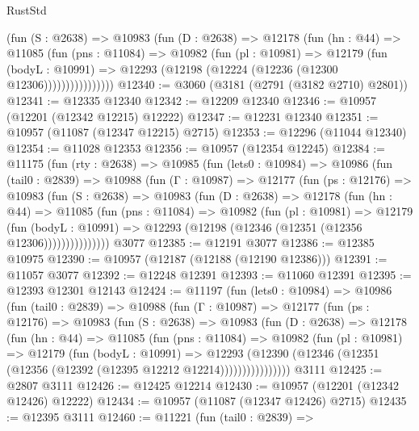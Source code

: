 \begin{lexlean}{RustStd}
\begin{coremodule}
                (fun (S : @2638) =>
                @10983
                  (fun (D : @2638) =>
                  @12178
                    (fun (hn : @44) =>
                    @11085
                      (fun (pns : @11084) =>
                      @10982
                        (fun (pl : @10981) =>
                        @12179
                          (fun (bodyL : @10991) =>
                          @12293 (@12198 (@12224 (@12236 (@12300 @12306))))))))))))))))
@12340 := @3060 (@3181 (@2791 (@3182 @2710) @2801))
@12341 := @12335 @12340
@12342 := @12209 @12340
@12346 := @10957 (@12201 (@12342 @12215) @12222)
@12347 := @12231 @12340
@12351 := @10957 (@11087 (@12347 @12215) @2715)
@12353 := @12296 (@11044 @12340)
@12354 := @11028 @12353
@12356 := @10957 (@12354 @12245)
@12384 := @11175
    (fun (rty : @2638) =>
    @10985
      (fun (lets0 : @10984) =>
      @10986
        (fun (tail0 : @2839) =>
        @10988
          (fun (Γ : @10987) =>
          @12177
            (fun (ps : @12176) =>
            @10983
              (fun (S : @2638) =>
              @10983
                (fun (D : @2638) =>
                @12178
                  (fun (hn : @44) =>
                  @11085
                    (fun (pns : @11084) =>
                    @10982
                      (fun (pl : @10981) =>
                      @12179
                        (fun (bodyL : @10991) =>
                        @12293 (@12198 (@12346 (@12351 (@12356 @12306)))))))))))))))
    @3077
@12385 := @12191 @3077
@12386 := @12385 @10975
@12390 := @10957 (@12187 (@12188 (@12190 @12386)))
@12391 := @11057 @3077
@12392 := @12248 @12391
@12393 := @11060 @12391
@12395 := @12393 @12301 @12143
@12424 := @11197
    (fun (lets0 : @10984) =>
    @10986
      (fun (tail0 : @2839) =>
      @10988
        (fun (Γ : @10987) =>
        @12177
          (fun (ps : @12176) =>
          @10983
            (fun (S : @2638) =>
            @10983
              (fun (D : @2638) =>
              @12178
                (fun (hn : @44) =>
                @11085
                  (fun (pns : @11084) =>
                  @10982
                    (fun (pl : @10981) =>
                    @12179
                      (fun (bodyL : @10991) =>
                      @12293
                        (@12390
                          (@12346 (@12351 (@12356 (@12392 (@12395 @12212 @12214))))))))))))))))
    @3111
@12425 := @2807 @3111
@12426 := @12425 @12214
@12430 := @10957 (@12201 (@12342 @12426) @12222)
@12434 := @10957 (@11087 (@12347 @12426) @2715)
@12435 := @12395 @3111
@12460 := @11221
    (fun (tail0 : @2839) =>

\end{coremodule}
\end{lexlean}

